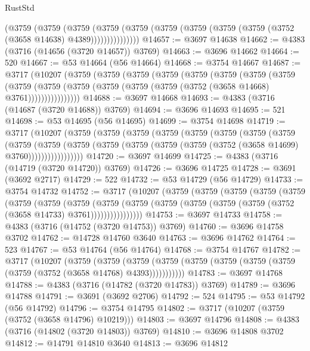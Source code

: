 \begin{lexlean}{RustStd}
\begin{coremodule}
              (@3759
                (@3759
                  (@3759
                    (@3759
                      (@3759 (@3759 (@3759 (@3759 (@3759 (@3752 (@3658 @14638) @4389)))))))))))))))
@14657 := @3697 @14638
@14662 := @4383 (@3716 (@14656 (@3720 @14657)) @3769)
@14663 := @3696 @14662
@14664 := 520
@14667 := @53 @14664 (@56 @14664)
@14668 := @3754 @14667
@14687 := @3717
    (@10207
      (@3759
        (@3759
          (@3759
            (@3759
              (@3759
                (@3759
                  (@3759
                    (@3759
                      (@3759
                        (@3759
                          (@3759 (@3759 (@3759 (@3759 (@3752 (@3658 @14668) @3761))))))))))))))))
@14688 := @3697 @14668
@14693 := @4383 (@3716 (@14687 (@3720 @14688)) @3769)
@14694 := @3696 @14693
@14695 := 521
@14698 := @53 @14695 (@56 @14695)
@14699 := @3754 @14698
@14719 := @3717
    (@10207
      (@3759
        (@3759
          (@3759
            (@3759
              (@3759
                (@3759
                  (@3759
                    (@3759
                      (@3759
                        (@3759
                          (@3759
                            (@3759 (@3759 (@3759 (@3759 (@3752 (@3658 @14699) @3760)))))))))))))))))
@14720 := @3697 @14699
@14725 := @4383 (@3716 (@14719 (@3720 @14720)) @3769)
@14726 := @3696 @14725
@14728 := @3691 (@3692 @2717)
@14729 := 522
@14732 := @53 @14729 (@56 @14729)
@14733 := @3754 @14732
@14752 := @3717
    (@10207
      (@3759
        (@3759
          (@3759
            (@3759
              (@3759
                (@3759
                  (@3759
                    (@3759
                      (@3759
                        (@3759
                          (@3759 (@3759 (@3759 (@3759 (@3752 (@3658 @14733) @3761))))))))))))))))
@14753 := @3697 @14733
@14758 := @4383 (@3716 (@14752 (@3720 @14753)) @3769)
@14760 := @3696 @14758 @3702
@14762 := @14728 @14760 @3640
@14763 := @3696 @14762
@14764 := 523
@14767 := @53 @14764 (@56 @14764)
@14768 := @3754 @14767
@14782 := @3717
    (@10207
      (@3759
        (@3759
          (@3759 (@3759 (@3759 (@3759 (@3759 (@3759 (@3759 (@3752 (@3658 @14768) @4393)))))))))))
@14783 := @3697 @14768
@14788 := @4383 (@3716 (@14782 (@3720 @14783)) @3769)
@14789 := @3696 @14788
@14791 := @3691 (@3692 @2706)
@14792 := 524
@14795 := @53 @14792 (@56 @14792)
@14796 := @3754 @14795
@14802 := @3717 (@10207 (@3759 (@3752 (@3658 @14796) @10219)))
@14803 := @3697 @14796
@14808 := @4383 (@3716 (@14802 (@3720 @14803)) @3769)
@14810 := @3696 @14808 @3702
@14812 := @14791 @14810 @3640
@14813 := @3696 @14812

\end{coremodule}
\end{lexlean}
